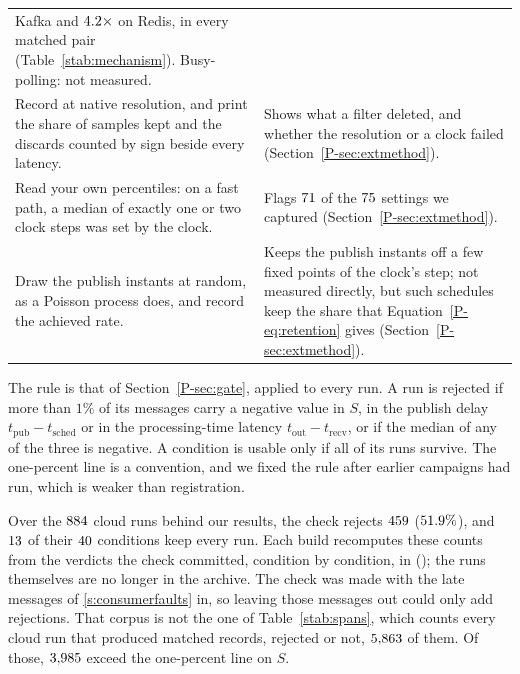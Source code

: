 \documentclass[10pt,journal,onecolumn]{IEEEtran}
\newcommand{\kafka}{Kafka}
\newcommand{\redis}{Redis}
\begin{document}
\begin{table}[tb]
\begin{tabular}{@{}p{}p{}@{}}
\kafka{} and $4.2\times$ on \redis{}, in every matched pair
(Table~\ref{stab:mechanism}). Busy-polling: not measured. \\
\addlinespace[2pt]
Record at native resolution, and print the share of samples kept and the discards counted by sign
beside every latency. & Shows what a filter deleted, and whether the resolution or a clock failed
(Section~\ref{P-sec:extmethod}). \\
\addlinespace[2pt]
Read your own percentiles: on a fast path, a median of exactly one or two clock steps was set by
the clock. & Flags $71$ of the $75$ settings we captured
(Section~\ref{P-sec:extmethod}). \\
\addlinespace[2pt]
\raggedright Draw the publish instants at random, as a Poisson process does, and record the
achieved rate. & Keeps the publish instants off a few fixed points of the clock's step; not measured directly, but
such schedules keep the share that Equation~\ref{P-eq:retention} gives (Section~\ref{P-sec:extmethod}). \\
\bottomrule
\end{tabular}
\end{table}

The rule is that of Section~\ref{P-sec:gate}, applied to every run. A run is rejected if more than
$1\%$ of its messages carry a negative value in $S$, in the publish delay $t_{\mathrm{pub}} -
t_{\mathrm{sched}}$ or in the processing-time latency $t_{\mathrm{out}} - t_{\mathrm{recv}}$, or if
the median of any of the three is negative. A condition is usable only if all of its runs
survive. The one-percent line is a convention, and we fixed the rule after earlier campaigns had
run, which is weaker than registration.

Over the $884$ cloud runs behind our results, the check rejects $459$
($51.9\%$), and $13$ of their $40$
conditions keep every run. Each build recomputes these counts from the verdicts the check
committed, condition by condition, in 
(); the runs themselves are no longer in the archive. The check was
made with the late messages of \ref{s:consumerfaults} in, so leaving those messages out could only
add rejections. That corpus is not the one of Table~\ref{stab:spans}, which counts
every cloud run that produced matched records, rejected or not, $5{,}863$ of them. Of those,
$3{,}985$ exceed the one-percent line on $S$.
\end{document}

